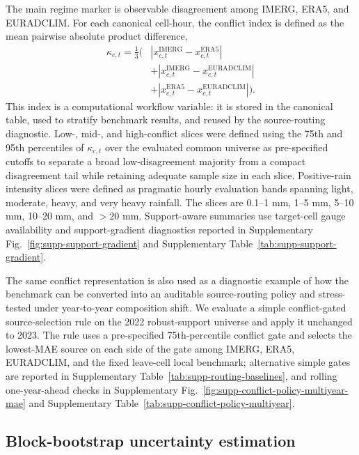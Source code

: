\documentclass[preprint,12pt]{elsarticle}
\begin{document}
The main regime marker is observable disagreement among IMERG, ERA5, and EURADCLIM. For each canonical cell-hour, the conflict index is defined as the mean pairwise absolute product difference,
\[
\begin{aligned}
\kappa_{c,t} = \frac{1}{3}\big(&
\left|x_{c,t}^{\mathrm{IMERG}} - x_{c,t}^{\mathrm{ERA5}}\right|\\
&+ \left|x_{c,t}^{\mathrm{IMERG}} - x_{c,t}^{\mathrm{EURADCLIM}}\right|\\
&+ \left|x_{c,t}^{\mathrm{ERA5}} - x_{c,t}^{\mathrm{EURADCLIM}}\right|\big).
\end{aligned}
\]
This index is a computational workflow variable: it is stored in the canonical table, used to stratify benchmark results, and reused by the source-routing diagnostic. Low-, mid-, and high-conflict slices were defined using the 75th and 95th percentiles of \(\kappa_{c,t}\) over the evaluated common universe as pre-specified cutoffs to separate a broad low-disagreement majority from a compact disagreement tail while retaining adequate sample size in each slice. Positive-rain intensity slices were defined as pragmatic hourly evaluation bands spanning light, moderate, heavy, and very heavy rainfall. The slices are 0.1--1 mm, 1--5 mm, 5--10 mm, 10--20 mm, and \(>20\) mm. Support-aware summaries use target-cell gauge availability and support-gradient diagnostics reported in Supplementary Fig.~\ref{fig:supp-support-gradient} and Supplementary Table~\ref{tab:supp-support-gradient}.

The same conflict representation is also used as a diagnostic example of how the benchmark can be converted into an auditable source-routing policy and stress-tested under year-to-year composition shift. We evaluate a simple conflict-gated source-selection rule on the 2022 robust-support universe and apply it unchanged to 2023. The rule uses a pre-specified 75th-percentile conflict gate and selects the lowest-MAE source on each side of the gate among IMERG, ERA5, EURADCLIM, and the fixed leave-cell local benchmark; alternative simple gates are reported in Supplementary Table~\ref{tab:supp-routing-baselines}, and rolling one-year-ahead checks in Supplementary Fig.~\ref{fig:supp-conflict-policy-multiyear-mae} and Supplementary Table~\ref{tab:supp-conflict-policy-multiyear}.

\subsection{Block-bootstrap uncertainty estimation}
\end{document}
